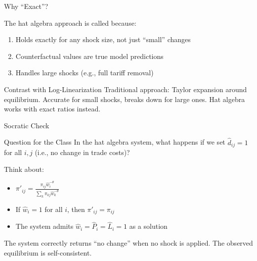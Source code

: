\documentclass{beamer}
\begin{document}
\begin{frame}{Why ``Exact''?}

    The hat algebra approach is called  because:

    \vspace{0.3em}
    \begin{enumerate}
        \item {} Holds exactly for any shock size, not just ``small'' changes
        \item {} Counterfactual values are true model predictions
        \item {} Handles large shocks (e.g., full tariff removal)
    \end{enumerate}

    \vspace{0.3em}
    \begin{exampleblock}{Contrast with Log-Linearization}
        Traditional approach: Taylor expansion around equilibrium. Accurate for small shocks, breaks down for large ones. Hat algebra works with exact ratios instead.
    \end{exampleblock}

\end{frame}

\begin{frame}{Socratic Check}

    \begin{block}{Question for the Class}
        In the hat algebra system, what happens if we set $\hat{d}_{ij} = 1$ for all $i,j$ (i.e., no change in trade costs)?
    \end{block}

    \vspace{1em}
    Think about:
    \begin{itemize}
        \item $\pi'_{ij} = \frac{\pi_{ij} \hat{w}_i^{-\theta}}{\sum_k \pi_{kj} \hat{w}_k^{-\theta}}$
        \item If $\hat{w}_i = 1$ for all $i$, then $\pi'_{ij} = \pi_{ij}$
        \item The system admits $\hat{w}_i = \hat{P}_i = \hat{L}_i = 1$ as a solution
    \end{itemize}

    \vspace{0.5em}
     The system correctly returns ``no change'' when no shock is applied. The observed equilibrium is self-consistent.

\end{frame}
\end{document}
